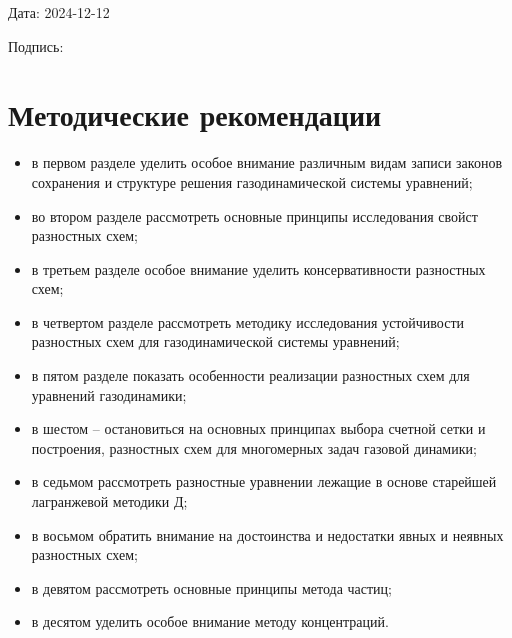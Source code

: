 \documentclass[a4paper,12pt]{article}
\begin{document}
Дата: 2024-12-12

Подпись: \underline{\hspace{3cm}}

\section*{Методические рекомендации}
\begin{itemize}
\item в первом разделе уделить особое внимание различным видам записи законов сохранения и структуре решения газодинамической системы уравнений;
\item во втором разделе рассмотреть основные принципы исследования свойст разностных схем;
\item в третьем разделе особое внимание уделить консервативности разностных схем;
\item в четвертом разделе рассмотреть методику исследования устойчивости разностных схем для газодинамической системы уравнений;
\item в пятом разделе показать особенности реализации разностных схем для уравнений газодинамики;
\item в шестом -- остановиться на основных принципах выбора счетной сетки и построения, разностных схем для многомерных задач газовой динамики;
\item в седьмом рассмотреть разностные уравнении лежащие в основе старейшей лагранжевой методики Д;
\item в восьмом обратить внимание на достоинства и недостатки явных и неявных разностных схем;
\item в девятом рассмотреть основные принципы метода частиц;
\item в десятом уделить особое внимание методу концентраций.
\end{itemize}
\end{document}
